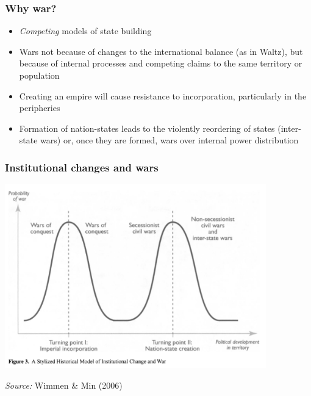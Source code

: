 \documentclass[utf8, xcolor=dvipsnames]{beamer}
\begin{document}
\begin{frame}
\frametitle{Why war?}
\centering

\begin{itemize}[<+->]
  \item \textit{Competing} models of state building
  \item Wars not because of changes to the international balance (as in Waltz), but because of internal processes and competing claims to the same territory or population
  \item Creating an empire will cause resistance to incorporation, particularly in the peripheries
  \item Formation of nation-states leads to the violently reordering of states (inter-state wars) or, once they are formed, wars over internal power distribution
\end{itemize}

\end{frame}


\begin{frame}
\frametitle{Institutional changes and wars}
\centering

\includegraphics[width = 0.85\textwidth]{img/wimmer_min_fig3}

{\scriptsize \textit{Source:} Wimmen \& Min (2006)}

\end{frame}
\end{document}

